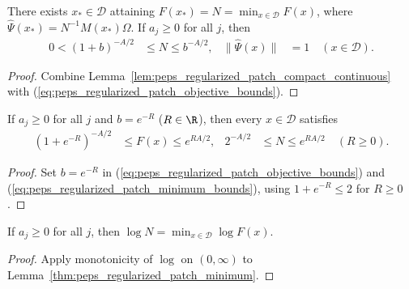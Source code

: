 \begin{lemma}
    \label{thm:peps_regularized_patch_minimum}
    \leanok
    There exists $x_*\in\mathcal D$ attaining $F(x_*)=N=\min_{x\in\mathcal D}F(x)$,
    where $\widehat\Psi(x_*)=N^{-1}M(x_*)\Omega$. If $a_j\ge0$ for all $j$, then
    \begin{align}
        0<(1+b)^{-A/2}      & \le N\le b^{-A/2},       &
        \|\widehat\Psi(x)\| & =1\quad(x\in\mathcal D).
        \label{eq:peps_regularized_patch_minimum_bounds}
    \end{align}
\end{lemma}
\begin{proof}
    \leanok
    Combine Lemma~\ref{lem:peps_regularized_patch_compact_continuous} with
    (\ref{eq:peps_regularized_patch_objective_bounds}).
\end{proof}

\begin{corollary}
    \label{cor:peps_regularized_patch_exp_bounds}
    \leanok
    If $a_j\ge0$ for all $j$ and $b=e^{-R}$ ($R\in\R$), then every
    $x\in\mathcal D$ satisfies
    \begin{align}
        (1+e^{-R})^{-A/2} & \le F(x)\le e^{RA/2},          &
        2^{-A/2}          & \le N\le e^{RA/2}\quad(R\ge0).
        \label{eq:peps_regularized_patch_exp_bounds}
    \end{align}
\end{corollary}
\begin{proof}
    \leanok
    Set $b=e^{-R}$ in (\ref{eq:peps_regularized_patch_objective_bounds}) and
    (\ref{eq:peps_regularized_patch_minimum_bounds}), using $1+e^{-R}\le2$ for
    $R\ge0$.
\end{proof}

\begin{lemma}
    \label{thm:peps_regularized_patch_log_minimum}
    \leanok
    If $a_j\ge0$ for all $j$, then $\log N=\min_{x\in\mathcal D}\log F(x)$.
\end{lemma}
\begin{proof}
    \leanok
    Apply monotonicity of $\log$ on $(0,\infty)$ to
    Lemma~\ref{thm:peps_regularized_patch_minimum}.
\end{proof}

